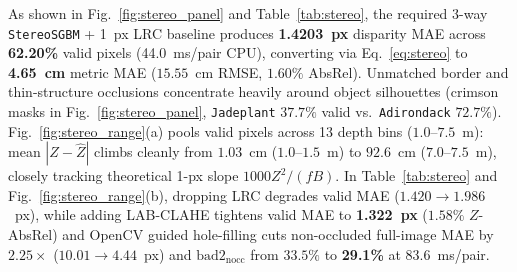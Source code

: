 \documentclass[10pt,twocolumn,letterpaper]{article}
\begin{document}
As shown in Fig.~\ref{fig:stereo_panel} and Table~\ref{tab:stereo}, the required 3-way \texttt{StereoSGBM} + 1~px LRC baseline produces \textbf{1.4203~px} disparity MAE across \textbf{62.20\%} valid pixels (44.0~ms/pair CPU), converting via Eq.~\ref{eq:stereo} to \textbf{4.65~cm} metric MAE ($15.55$~cm RMSE, $1.60\%$ AbsRel). Unmatched border and thin-structure occlusions concentrate heavily around object silhouettes (crimson masks in Fig.~\ref{fig:stereo_panel}, \texttt{Jadeplant} $37.7\%$ valid vs.\ \texttt{Adirondack} $72.7\%$). Fig.~\ref{fig:stereo_range}(a) pools valid pixels across 13 depth bins ($1.0$--$7.5$~m): mean $|Z-\hat{Z}|$ climbs cleanly from $1.03$~cm ($1.0$--$1.5$~m) to $92.6$~cm ($7.0$--$7.5$~m), closely tracking theoretical 1-px slope $1000 Z^2/(fB)$. In Table~\ref{tab:stereo} and Fig.~\ref{fig:stereo_range}(b), dropping LRC degrades valid MAE ($1.420\to 1.986$~px), while adding LAB-CLAHE tightens valid MAE to \textbf{1.322~px} ($1.58\%$ $Z$-AbsRel) and OpenCV guided hole-filling cuts non-occluded full-image MAE by $2.25\times$ ($10.01\to 4.44$~px) and $\mathrm{bad2}_{\text{nocc}}$ from $33.5\%$ to \textbf{29.1\%} at $83.6$~ms/pair.
\end{document}
